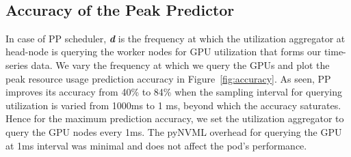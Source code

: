 


~\subsection{Accuracy of the Peak Predictor}\label{sec:picking}
In case of PP scheduler, \textit{\textbf{d}} is the frequency at which the utilization aggregator at head-node is querying the worker nodes for GPU utilization that forms our time-series data. We vary the frequency at which we query the GPUs and plot the peak resource usage prediction accuracy in Figure~\ref{fig:accuracy}. As seen, PP improves its accuracy from 40\% to 84\% when the sampling interval for querying utilization is varied from 1000ms to 1 ms, beyond which the accuracy saturates. Hence for the maximum prediction accuracy, we set the utilization aggregator to query the GPU nodes every 1ms. The pyNVML overhead for querying the GPU at 1ms interval was minimal and does not affect the pod's performance. 

